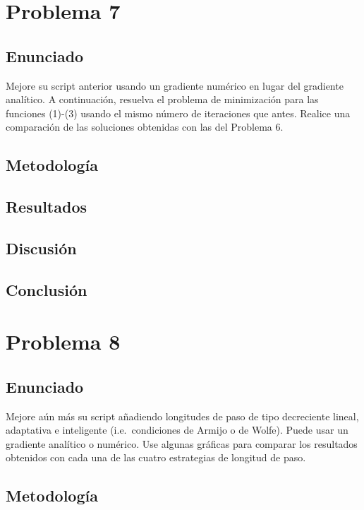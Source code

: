 \documentclass{article}
\begin{document}
\section{Problema 7}

\subsection{Enunciado}
Mejore su script anterior usando un gradiente numérico en lugar del gradiente analítico. A continuación, resuelva el problema de minimización para las funciones (1)-(3) usando el mismo número de iteraciones que antes. Realice una comparación de las soluciones obtenidas con las del Problema 6.


\subsection{Metodología}

\subsection{Resultados}
\setcounter{equation}{0}

\subsection{Discusión}

\subsection{Conclusión}

\section{Problema 8}

\subsection{Enunciado}
Mejore aún más su script añadiendo longitudes de paso de tipo decreciente lineal, adaptativa e inteligente (i.e.\ condiciones de Armijo o de Wolfe). Puede usar un gradiente analítico o numérico. Use algunas gráficas para comparar los resultados obtenidos con cada una de las cuatro estrategias de longitud de paso.

\subsection{Metodología}
\end{document}
